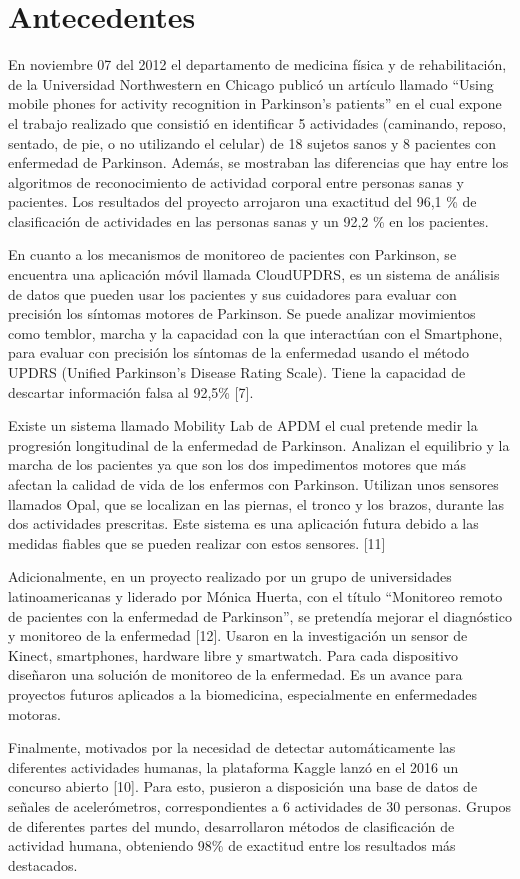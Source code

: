 \documentclass[11pt]{report} %
\begin{document}
\section{Antecedentes}
En noviembre 07 del 2012 el departamento de medicina física y de rehabilitación, de la Universidad Northwestern
en Chicago publicó un artículo llamado “Using mobile phones for activity recognition in Parkinson’s patients” en
el cual expone el trabajo realizado que consistió en identificar 5 actividades (caminando, reposo, sentado, de pie,
o no utilizando el celular) de 18 sujetos sanos y 8 pacientes con enfermedad de Parkinson. Además, se mostraban
las diferencias que hay entre los algoritmos de reconocimiento de actividad corporal entre personas sanas y
pacientes. Los resultados del proyecto arrojaron una exactitud del 96,1 \% de clasificación de actividades en las
personas sanas y un 92,2 \% en los pacientes. 
\par
\medskip
\noindent
En cuanto a los mecanismos de monitoreo de pacientes con Parkinson, se encuentra una aplicación móvil llamada
CloudUPDRS, es un sistema de análisis de datos que pueden usar los pacientes y sus cuidadores para evaluar con
precisión los síntomas motores de Parkinson. Se puede analizar movimientos como temblor, marcha y la capacidad
con la que interactúan con el Smartphone, para evaluar con precisión los síntomas de la enfermedad usando el
método UPDRS (Unified Parkinson’s Disease Rating Scale). Tiene la capacidad de descartar información falsa al
92,5\% [7].
\par
\medskip
\noindent
Existe un sistema llamado Mobility Lab de APDM el cual pretende medir la progresión longitudinal de la
enfermedad de Parkinson. Analizan el equilibrio y la marcha de los pacientes ya que son los dos impedimentos
motores que más afectan la calidad de vida de los enfermos con Parkinson. Utilizan unos sensores llamados Opal,
que se localizan en las piernas, el tronco y los brazos, durante las dos actividades prescritas. Este sistema es una
aplicación futura debido a las medidas fiables que se pueden realizar con estos sensores. [11]
\par
\medskip
\noindent
Adicionalmente, en un proyecto realizado por un grupo de universidades latinoamericanas y liderado por Mónica
Huerta, con el título “Monitoreo remoto de pacientes con la enfermedad de Parkinson”, se pretendía mejorar el
diagnóstico y monitoreo de la enfermedad [12]. Usaron en la investigación un sensor de Kinect, smartphones,
hardware libre y smartwatch. Para cada dispositivo diseñaron una solución de monitoreo de la enfermedad. Es un
avance para proyectos futuros aplicados a la biomedicina, especialmente en enfermedades motoras.
\par
\medskip
\noindent
Finalmente, motivados por la necesidad de detectar automáticamente las diferentes actividades humanas, la
plataforma Kaggle lanzó en el 2016 un concurso abierto [10]. Para esto, pusieron a disposición una base de datos
de señales de acelerómetros, correspondientes a 6 actividades de 30 personas. Grupos de diferentes partes del
mundo, desarrollaron métodos de clasificación de actividad humana, obteniendo 98\% de exactitud entre los
resultados más destacados.
\end{document}
